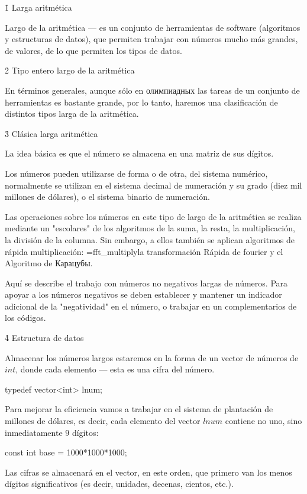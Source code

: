 \h1{ Larga aritmética }

Largo de la aritmética --- es un conjunto de herramientas de software (algoritmos y estructuras de datos), que permiten trabajar con números mucho más grandes, de valores, de lo que permiten los tipos de datos.


\h2{ Tipo entero largo de la aritmética }

En términos generales, aunque sólo en олимпиадных las tareas de un conjunto de herramientas es bastante grande, por lo tanto, haremos una clasificación de distintos tipos larga de la aritmética.


\h3{ Clásica larga aritmética }

La idea básica es que el número se almacena en una matriz de sus dígitos.

Los números pueden utilizarse de forma o de otra, del sistema numérico, normalmente se utilizan en el sistema decimal de numeración y su grado (diez mil millones de dólares), o el sistema binario de numeración.

Las operaciones sobre los números en este tipo de largo de la aritmética se realiza mediante un "escolares" de los algoritmos de la suma, la resta, la multiplicación, la división de la columna. Sin embargo, a ellos también se aplican algoritmos de rápida multiplicación: \algohref=fft_multiply{la transformación Rápida de fourier} y el Algoritmo de Карацубы.

Aquí se describe el trabajo con números no negativos largas de números. Para apoyar a los números negativos se deben establecer y mantener un indicador adicional de la "negatividad" en el número, o trabajar en un complementarios de los códigos.


\h4{ Estructura de datos }

Almacenar los números largos estaremos en la forma de un vector de números de $int$, donde cada elemento --- esta es una cifra del número.

\code
typedef vector<int> lnum;
\endcode

Para mejorar la eficiencia vamos a trabajar en el sistema de plantación de millones de dólares, es decir, cada elemento del vector $lnum$ contiene no uno, sino inmediatamente $9$ dígitos:

\code
const int base = 1000*1000*1000;
\endcode

Las cifras se almacenará en el vector, en este orden, que primero van los menos dígitos significativos (es decir, unidades, decenas, cientos, etc.).

